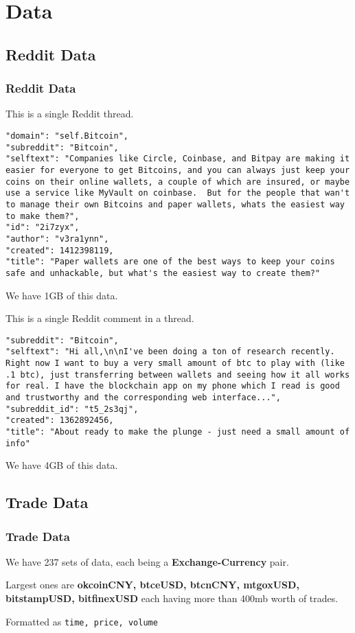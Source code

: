 \documentclass[9pt, compress]{beamer}
\begin{document}
\section{Data}

\subsection{Reddit Data}
\begin{frame}[fragile]
\frametitle{Reddit Data}
This is a single Reddit thread.

\begin{lstlisting}
"domain": "self.Bitcoin",
"subreddit": "Bitcoin",
"selftext": "Companies like Circle, Coinbase, and Bitpay are making it easier for everyone to get Bitcoins, and you can always just keep your coins on their online wallets, a couple of which are insured, or maybe use a service like MyVault on coinbase.  But for the people that wan't to manage their own Bitcoins and paper wallets, whats the easiest way to make them?",
"id": "2i7zyx",
"author": "v3ra1ynn",
"created": 1412398119,
"title": "Paper wallets are one of the best ways to keep your coins safe and unhackable, but what's the easiest way to create them?"
\end{lstlisting}

We have 1GB of this data.
\end{frame}

\begin{frame}[fragile]
This is a single Reddit comment in a thread.

\begin{lstlisting}
"subreddit": "Bitcoin",
"selftext": "Hi all,\n\nI've been doing a ton of research recently. Right now I want to buy a very small amount of btc to play with (like .1 btc), just transferring between wallets and seeing how it all works for real. I have the blockchain app on my phone which I read is good and trustworthy and the corresponding web interface...",
"subreddit_id": "t5_2s3qj",
"created": 1362892456,
"title": "About ready to make the plunge - just need a small amount of info"
\end{lstlisting}

We have 4GB of this data.
\end{frame}

\subsection{Trade Data}
\begin{frame}[fragile]
\frametitle{Trade Data}
We have 237 sets of data, each being a \textbf{Exchange-Currency} pair.

Largest ones are \textbf{okcoinCNY, btceUSD, btcnCNY, mtgoxUSD, bitstampUSD, bitfinexUSD} each having more than 400mb worth of trades. 

Formatted as \texttt{time, price, volume}
\end{frame}
\end{document}
